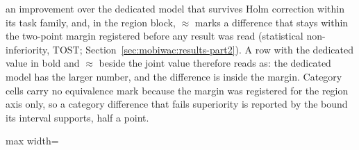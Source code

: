 \begin{table}[htbp]
{an improvement over the dedicated model that survives Holm correction within its task family, and, in
the region block, $\approx$ marks a difference that stays within the two-point margin registered
before any result was read (statistical non-inferiority, TOST;
Section~\ref{sec:mobiwac:results-part2}). A row with the dedicated value in bold and $\approx$ beside
the joint value therefore reads as: the dedicated model has the larger number, and the difference is
inside the margin. Category cells carry no equivalence mark because the margin was registered for the
region axis only, so a category difference that fails superiority is reported by the bound its
interval supports, half a point.}
\label{tab:mobiwac:results}
\centering
\begin{adjustbox}{max width=\textwidth}

\end{adjustbox}
\end{table}
